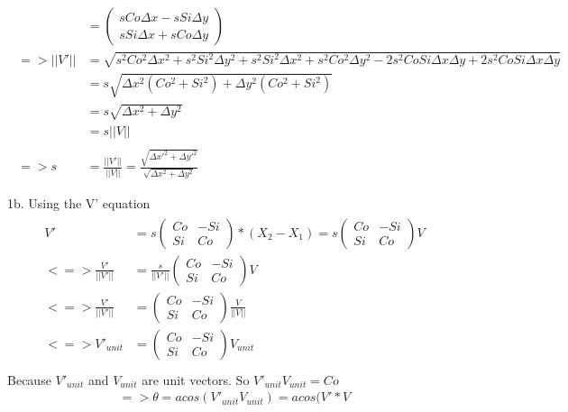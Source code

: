 \documentclass{article}
\begin{document}
\begin{gather*}
\begin{split}
       &= \begin{pmatrix} sCo\Delta x - sSi\Delta y\\ 
                          sSi\Delta x + sCo\Delta y \end{pmatrix} \\
=> ||V'|| &= \sqrt{s^2Co^2\Delta x^2 + s^2Si^2\Delta y^2 + s^2Si^2\Delta x^2 + s^2Co^2\Delta y^2 - 2s^2CoSi\Delta x\Delta y + 2s^2CoSi\Delta x\Delta y} \\
          &= s\sqrt{\Delta x^2(Co^2+Si^2) + \Delta y^2(Co^2+Si^2)} \\
          &= s\sqrt{\Delta x^2 + \Delta y^2} \\
          &= s||V|| \\ \\
=> s &= \frac{||V'||}{||V||} = \frac{\sqrt{\Delta x'^2 + \Delta y'^2}}{\sqrt{\Delta x^2 + \Delta y^2}}\\ \\
\end{split}
\end{gather*}
\noindent 1b. Using the V' equation \\
\begin{gather*}
\begin{split}
    V' &= s\begin{pmatrix} Co&-Si \\ Si&Co\end{pmatrix} * (X_2 - X_1)
       = s\begin{pmatrix} Co&-Si \\ Si&Co\end{pmatrix} V \\
<=> \frac{V'}{||V'||} &= \frac{s}{||V'||}\begin{pmatrix} Co&-Si \\ Si&Co\end{pmatrix} V \\
<=> \frac{V'}{||V'||} &= \begin{pmatrix} Co&-Si \\ Si&Co\end{pmatrix} \frac{V}{||V||} \\
<=> V'_{unit} &= \begin{pmatrix} Co&-Si \\ Si&Co \end{pmatrix} V_{unit} \\
\end{split}
\end{gather*}
\noindent Because $V'_{unit}$ and $V_{unit}$ are unit vectors. So $V'_{unit}V_{unit} = Co$
\begin{gather*}
=>  \theta = acos(V'_{unit}V_{unit}) = acos(V'*V    
\end{gather*}
\end{document}
